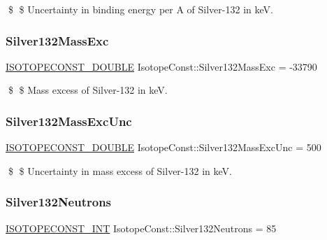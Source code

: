 \$ \$ Uncertainty in binding energy per A of Silver-\/132 in keV. \mbox{\label{group___isotope_const-_silver-_ag132_ga5d6a49f35c7775fc19bd26808b9854e7}} 
\subsubsection{\texorpdfstring{Silver132\+Mass\+Exc}{Silver132MassExc}}
{\footnotesize\ttfamily \mbox{\hyperlink{group___isotope_const-_macros_ga8f45a7272ce02c0b4c65c44636ed719a}{I\+S\+O\+T\+O\+P\+E\+C\+O\+N\+S\+T\+\_\+\+D\+O\+U\+B\+LE}} Isotope\+Const\+::\+Silver132\+Mass\+Exc = -\/33790}

\$ \$ Mass excess of Silver-\/132 in keV. \mbox{\label{group___isotope_const-_silver-_ag132_gacd5951423e03f851f093ccbbddbd0d2e}} 
\subsubsection{\texorpdfstring{Silver132\+Mass\+Exc\+Unc}{Silver132MassExcUnc}}
{\footnotesize\ttfamily \mbox{\hyperlink{group___isotope_const-_macros_ga8f45a7272ce02c0b4c65c44636ed719a}{I\+S\+O\+T\+O\+P\+E\+C\+O\+N\+S\+T\+\_\+\+D\+O\+U\+B\+LE}} Isotope\+Const\+::\+Silver132\+Mass\+Exc\+Unc = 500}

\$ \$ Uncertainty in mass excess of Silver-\/132 in keV. \mbox{\label{group___isotope_const-_silver-_ag132_gaf72368e24942d8fc853b1456a0e1750d}} 
\subsubsection{\texorpdfstring{Silver132\+Neutrons}{Silver132Neutrons}}
{\footnotesize\ttfamily \mbox{\hyperlink{group___isotope_const-_macros_ga5f18360b3e99483a35c32d789e62621c}{I\+S\+O\+T\+O\+P\+E\+C\+O\+N\+S\+T\+\_\+\+I\+NT}} Isotope\+Const\+::\+Silver132\+Neutrons = 85}

